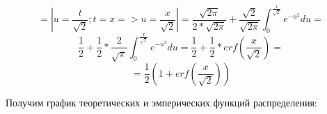 \documentclass{article}
\begin{document}
\[=\left|u =\frac{t}{\sqrt{2}}; t = x => u = \frac{x}{\sqrt{2}}\right|=
\frac{\sqrt{2\pi}}{2*\sqrt{2\pi}}+\frac{\sqrt{2}}{\sqrt{2\pi}}\int_{0}^{\frac{x}{\sqrt{2}}}e^{-u^2}du=\]
\[\frac{1}{2}+\frac{1}{2}*\frac{2}{\sqrt{\pi}}\int_{0}^{\frac{x}{\sqrt{2}}}e^{-u^2}du = 
\frac{1}{2} + \frac{1}{2}*erf\left(\frac{x}{\sqrt{2}}\right) = \]
\[= \frac{1}{2}\left(1+erf\left(\frac{x}{\sqrt{2}}\right)\right)\]

Получим график теоретических и эмперических функций распределения:

\begin{figure}[h]
\end{figure}
\end{document}
